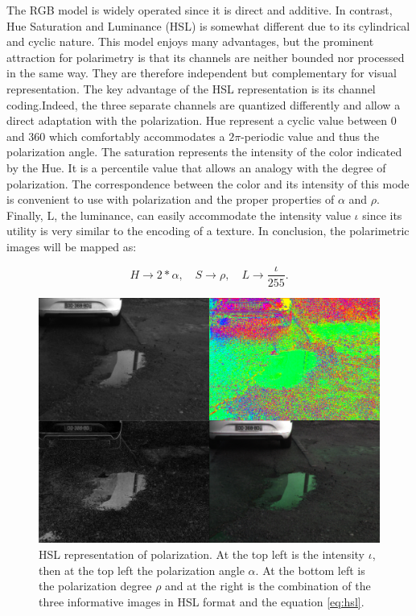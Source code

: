 The RGB model is widely operated since it is direct and additive. In contrast, Hue Saturation and Luminance (HSL) is somewhat different due to its cylindrical and cyclic nature. This model enjoys many advantages, but the prominent attraction for polarimetry is that its channels are neither bounded nor processed in the same way. They are therefore independent but complementary for visual representation.
The key advantage of the HSL representation is its channel coding.Indeed, the three separate channels are quantized differently and allow a direct adaptation with the polarization.
Hue represent a cyclic value between 0 and 360 which comfortably accommodates a $2\pi$-periodic value and thus the polarization angle.
The saturation represents the intensity of the color indicated by the Hue. It is a percentile value that allows an analogy with the degree of polarization. The correspondence between the color and its intensity of this mode is convenient to use with polarization and the proper properties of $\alpha$ and $\rho$.
Finally, L, the luminance, can easily accommodate the intensity value $\iota$ since its utility is very similar to the encoding of a texture.
In conclusion, the polarimetric images will be mapped as:

\begin{equation}\label{eq:hsl}
H \longrightarrow 2*\alpha,  \quad S \longrightarrow \rho, \quad L \longrightarrow \frac{\iota}{255}.
\end{equation}

\begin{figure}[h]
	\centering
	\includegraphics[width=0.8\linewidth]{Figures/Representation/4im}
	\caption[HSL representation of polarization.]{HSL representation of polarization. At the top left is the intensity $\iota$, then at the top left the polarization angle $\alpha$. At the bottom left is the polarization degree $\rho$ and at the right is the combination of the three informative images in HSL format and the equation \ref{eq:hsl}.}
	\label{fig:4im}
\end{figure}


